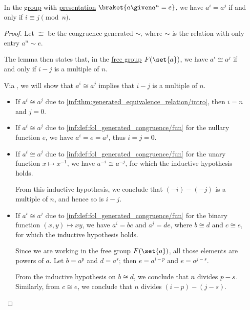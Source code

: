 \begin{lemma}\label{thm:finite_cyclic_group_order}
  In the \hyperref[def:group]{group} with \hyperref[def:group_presentation]{presentation} \( \braket{ a \given a^n = e } \), we have \( a^i = a^j \) if and only if \( i \equiv j \pmod n \).
\end{lemma}
\begin{proof}
  Let \( {\cong} \) be the congruence generated \( {\sim} \), where \( {\sim} \) is the relation with only entry \( a^n \sim e \).

  The lemma then states that, in the \hyperref[def:free_group]{free group} \( F(\set{ a }) \), we have \( a^i \cong a^j \) if and only if \( i - j \) is a multiple of \( n \).

  \SufficiencySubProof Via , we will show that \( a^i \cong a^j \) implies that \( i - j \) is a multiple of \( n \).
  \begin{itemize}
    \item If \( a^i \cong a^j \) due to \ref{inf:thm:generated_equivalence_relation/intro}, then \( i = n \) and \( j = 0 \).

    \item If \( a^i \cong a^j \) due to \ref{inf:def:fol_generated_congruence/fun} for the nullary function \( e \), we have \( a^i = e = a^j \), thus \( i = j = 0 \).

    \item If \( a^i \cong a^j \) due to \ref{inf:def:fol_generated_congruence/fun} for the unary function \( x \mapsto x^{-1} \), we have \( a^{-i} \cong a^{-j} \), for which the inductive hypothesis holds.

    From this inductive hypothesis, we conclude that \( (-i) - (-j) \) is a multiple of \( n \), and hence so is \( i - j \).

    \item If \( a^i \cong a^j \) due to \ref{inf:def:fol_generated_congruence/fun} for the binary function \( (x, y) \mapsto xy \), we have \( a^i = bc \) and \( a^j = de \), where \( b \cong d \) and \( c \cong e \), for which the inductive hypothesis holds.

    Since we are working in the free group \( F(\set{ a }) \), all those elements are powers of \( a \). Let \( b = a^p \) and \( d = a^s \); then \( e = a^{i - p} \) and \( e = a^{j - s} \).

    From the inductive hypothesis on \( b \cong d \), we conclude that \( n \) divides \( p - s \). Similarly, from \( c \cong e \), we conclude that \( n \) divides \( (i - p) - (j - s) \).


\end{itemize}
\end{proof}
